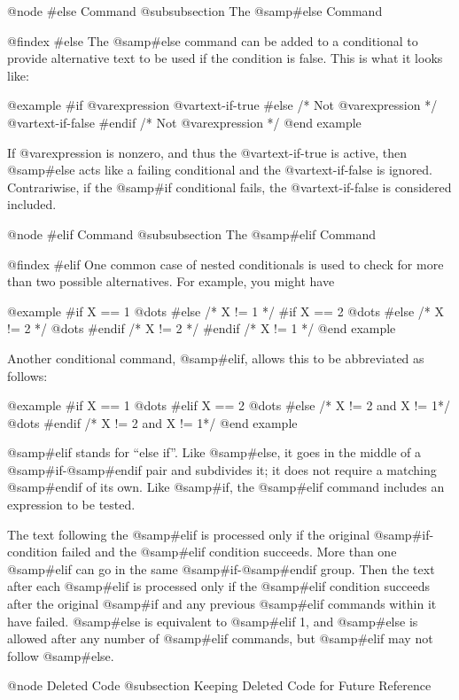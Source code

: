 {{@node #else Command
@subsubsection The @samp{#else} Command

@findex #else
The @samp{#else} command can be added to a conditional to provide
alternative text to be used if the condition is false.  This is what
it looks like:

@example
#if @var{expression}
@var{text-if-true}
#else /* Not @var{expression} */
@var{text-if-false}
#endif /* Not @var{expression} */
@end example

If @var{expression} is nonzero, and thus the @var{text-if-true} is 
active, then @samp{#else} acts like a failing conditional and the
@var{text-if-false} is ignored.  Contrariwise, if the @samp{#if}
conditional fails, the @var{text-if-false} is considered included.

@node #elif Command
@subsubsection The @samp{#elif} Command

@findex #elif
One common case of nested conditionals is used to check for more than two
possible alternatives.  For example, you might have

@example
#if X == 1
@dots{}
#else /* X != 1 */
#if X == 2
@dots{}
#else /* X != 2 */
@dots{}
#endif /* X != 2 */
#endif /* X != 1 */
@end example

Another conditional command, @samp{#elif}, allows this to be abbreviated
as follows:

@example
#if X == 1
@dots{}
#elif X == 2
@dots{}
#else /* X != 2 and X != 1*/
@dots{}
#endif /* X != 2 and X != 1*/
@end example

@samp{#elif} stands for ``else if''.  Like @samp{#else}, it goes in the
middle of a @samp{#if}-@samp{#endif} pair and subdivides it; it does not
require a matching @samp{#endif} of its own.  Like @samp{#if}, the
@samp{#elif} command includes an expression to be tested.

The text following the @samp{#elif} is processed only if the original
@samp{#if}-condition failed and the @samp{#elif} condition succeeds.
More than one @samp{#elif} can go in the same @samp{#if}-@samp{#endif}
group.  Then the text after each @samp{#elif} is processed only if the
@samp{#elif} condition succeeds after the original @samp{#if} and any
previous @samp{#elif} commands within it have failed.  @samp{#else} is
equivalent to @samp{#elif 1}, and @samp{#else} is allowed after any
number of @samp{#elif} commands, but @samp{#elif} may not follow
@samp{#else}.

@node Deleted Code
@subsection Keeping Deleted Code for Future Reference

}}
